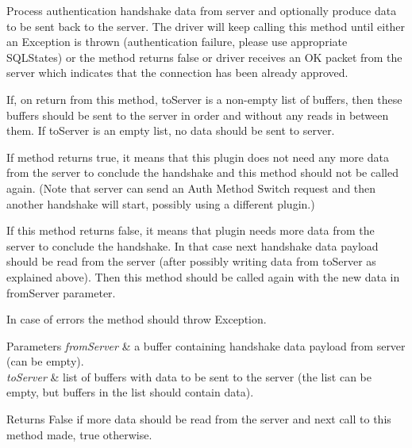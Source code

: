 Process authentication handshake data from server and optionally produce data to be sent back to the server. The driver will keep calling this method until either an Exception is thrown (authentication failure, please use appropriate S\+Q\+L\+States) or the method returns false or driver receives an OK packet from the server which indicates that the connection has been already approved.

If, on return from this method, to\+Server is a non-\/empty list of buffers, then these buffers should be sent to the server in order and without any reads in between them. If to\+Server is an empty list, no data should be sent to server.

If method returns true, it means that this plugin does not need any more data from the server to conclude the handshake and this method should not be called again. (Note that server can send an Auth Method Switch request and then another handshake will start, possibly using a different plugin.)

If this method returns false, it means that plugin needs more data from the server to conclude the handshake. In that case next handshake data payload should be read from the server (after possibly writing data from to\+Server as explained above). Then this method should be called again with the new data in from\+Server parameter.

In case of errors the method should throw Exception.


\begin{DoxyParams}{Parameters}
{\em from\+Server} & a buffer containing handshake data payload from server (can be empty). \\
\hline
{\em to\+Server} & list of buffers with data to be sent to the server (the list can be empty, but buffers in the list should contain data).\\
\hline
\end{DoxyParams}
\begin{DoxyReturn}{Returns}
False if more data should be read from the server and next call to this method made, true otherwise. 
\end{DoxyReturn}
\mbox{\label{interfacecom_1_1mysql_1_1cj_1_1protocol_1_1_authentication_plugin_a7dfc5f9b4c1e27d33982f8843254ee18}} 
